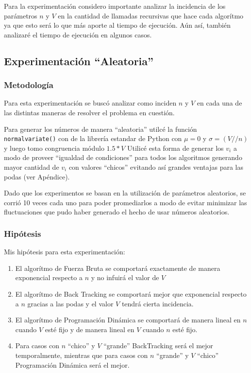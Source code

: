 Para la experimentaci\'on considero importante analizar la incidencia de los par\'ametros
$n$ y $V$ en la cantidad de llamadas recursivas que hace cada algor\'itmo ya que esto ser\'a lo que m\'as
aporte al tiempo de ejecuci\'on. A\'un as\'i, tambi\'en analizar\'e el tiempo de ejecuci\'on en algunos casos.

\subsection{Experimentaci\'on ``Aleatoria''}
\subsubsection{Metodolog\'ia}
\par Para esta experimentaci\'on se busc\'o analizar como inciden $n$ y $V$ en cada una
de las distintas maneras de resolver el problema en cuesti\'on. 
\par Para generar los n\'umeros de manera ``aleatoria'' utilc\'e la funci\'on \texttt{normalvariate()} con 
de la librer\'ia estandar de Python con $\mu = 0 $ y $\sigma = (V // n)$ y luego tomo congruencia m\'odulo $1.5*V$
Utilic\'e esta forma de generar los $v_i$ a modo de proveer ``igualdad de condiciones'' para todos los algoritmos
generando mayor cantidad de $v_i$ con valores ``chicos'' evitando as\'i grandes ventajas para las podas (ver Ap\'endice).
\par Dado que los experimentos se basan en la utilizaci\'on de par\'ametros aleatorios, se corri\'o 10 veces cada
uno para poder promediarlos a modo de evitar minimizar las fluctuaciones que pudo haber generado el hecho de usar
n\'umeros aleatorios.

\subsubsection{Hip\'otesis}
Mis hip\'otesis para esta experimentaci\'on:
\begin{enumerate}[I]
    \item El algor\'itmo de Fuerza Bruta se comportar\'a exactamente de manera exponencial respecto a $n$ y no 
    infuir\'a el valor de $V$
    \item El algor\'itmo de Back Tracking se comportar\'a mejor que exponencial respecto a $n$ gracias a las podas
    y el valor $V$ tendr\'a cierta incidencia.
    \item El algor\'itmo de Programaci\'on Din\'amica se comportar\'a de manera lineal en $n$ cuando $V$ est\'e fijo
    y de manera lineal en $V$ cuando $n$ est\'e fijo.
    \item Para casos con $n$ ``chico'' y $V$ ``grande'' BackTracking ser\'a el mejor temporalmente, mientras que para 
    casos con $n$ ``grande'' y $V$ ``chico'' Programaci\'on Din\'amica ser\'a el mejor.
\end{enumerate}


